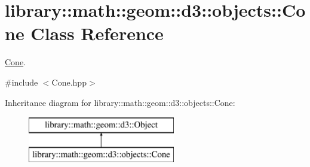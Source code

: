 \hypertarget{classlibrary_1_1math_1_1geom_1_1d3_1_1objects_1_1_cone}{}\section{library\+:\+:math\+:\+:geom\+:\+:d3\+:\+:objects\+:\+:Cone Class Reference}
\label{classlibrary_1_1math_1_1geom_1_1d3_1_1objects_1_1_cone}


\hyperlink{classlibrary_1_1math_1_1geom_1_1d3_1_1objects_1_1_cone}{Cone}.  




{\ttfamily \#include $<$Cone.\+hpp$>$}

Inheritance diagram for library\+:\+:math\+:\+:geom\+:\+:d3\+:\+:objects\+:\+:Cone\+:\begin{figure}[H]
\begin{center}
\leavevmode
\includegraphics[height=2.000000cm]{classlibrary_1_1math_1_1geom_1_1d3_1_1objects_1_1_cone}
\end{center}
\end{figure}
